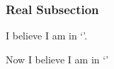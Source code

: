 \begin{ExampleBlock}{}
\subsubsection{Real Subsection}
I believe I am in `'.

Now I believe I am in `'



\end{ExampleBlock}
